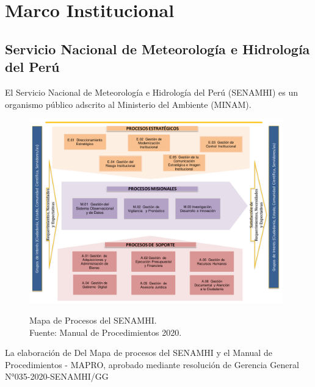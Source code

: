 \section{Marco Institucional}

\subsection{Servicio Nacional de Meteorología e Hidrología del Perú}

El Servicio Nacional de Meteorología e Hidrología del Perú (SENAMHI) es un 
organismo público adscrito al Ministerio del Ambiente (MINAM).

\begin{figure}[ht]
  \centering
  \includegraphics[height=8cm]{E_IMAGENES/2_MarcoTeorico/mapro}
  \label{fig:mapro}
  \caption{
    Mapa de Procesos del SENAMHI.\\
    Fuente: Manual de Procedimientos 2020.
  }
\end{figure}

La elaboración de 
Del Mapa de procesos del SENAMHI y el Manual de Procedimientos - MAPRO, 
aprobado mediante resolución de Gerencia General N°035-2020-SENAMHI/GG
